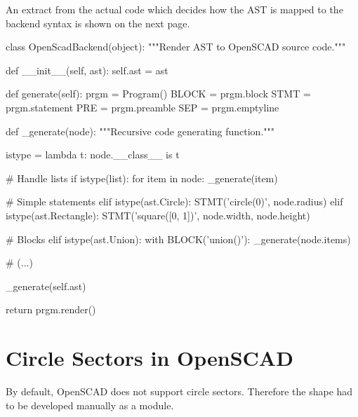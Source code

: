 An extract from the actual code which decides how the AST is mapped to the
backend syntax is shown on the next page.

\vspace{.5\baselineskip}
\begin{pythoncode}
class OpenScadBackend(object):
    """Render AST to OpenSCAD source code."""

    def __init__(self, ast):
        self.ast = ast

    def generate(self):
        prgm = Program()
        BLOCK = prgm.block
        STMT = prgm.statement
        PRE = prgm.preamble
        SEP = prgm.emptyline

        def _generate(node):
            """Recursive code generating function."""

            istype = lambda t: node.__class__ is t

            # Handle lists
            if istype(list):
                for item in node:
                    _generate(item)

            # Simple statements
            elif istype(ast.Circle):
                STMT('circle({0})', node.radius)
            elif istype(ast.Rectangle):
                STMT('square([{0}, {1}])', node.width, node.height)

            # Blocks
            elif istype(ast.Union):
                with BLOCK('union()'):
                    _generate(node.items)

            # (...)

        _generate(self.ast)

        return prgm.render()
\end{pythoncode}


\newpage
\section{Circle Sectors in OpenSCAD}\label{sec:design:circlesectors}

By default, OpenSCAD does not support circle sectors. Therefore the shape had to
be developed manually as a module.

